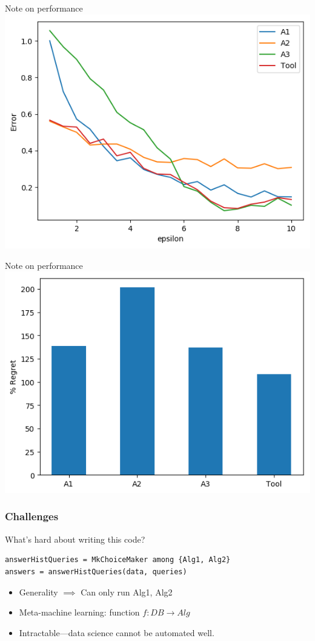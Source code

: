 \documentclass{beamer}
\begin{document}
\begin{frame}{Note on performance}
\includegraphics[scale=0.7]{hist_graphs/Perf.png}
\end{frame}

\begin{frame}{Note on performance}
\includegraphics[scale=0.7]{hist_graphs/regret.png}
\end{frame}

\begin{frame}[fragile]\frametitle{Challenges}
What's hard about writing this code?
\begin{lstlisting}[style=MyPythonStyle]
answerHistQueries = MkChoiceMaker among {Alg1, Alg2}
answers = answerHistQueries(data, queries)
\end{lstlisting}
\begin{itemize}
\item Generality $\implies$ Can only run Alg1, Alg2
\item Meta-machine learning: function $f: DB \rightarrow Alg$
\item Intractable---data science cannot be automated well.
\end{itemize}
\end{frame}
\end{document}
